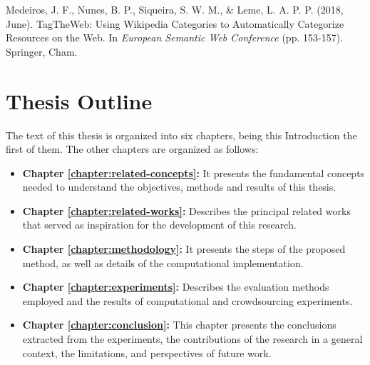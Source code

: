 Medeiros, J. F., Nunes, B. P., Siqueira, S. W. M., \& Leme, L. A. P. P. (2018, June). TagTheWeb: Using Wikipedia Categories to Automatically Categorize Resources on the Web. In \textit{European Semantic Web Conference} (pp. 153-157). Springer, Cham.

\section{\hspace*{3pt}Thesis Outline}

The text of this thesis is organized into six chapters, being this Introduction the first of them. The other chapters are organized as follows:

\begin{itemize}
\item\textbf {Chapter \ref{chapter:related-concepts}:} It presents the fundamental concepts needed to understand the objectives, methods and results of this thesis.

\item \textbf {Chapter \ref{chapter:related-works}:} Describes the principal related works that served as inspiration for the development of this research.

\item \textbf {Chapter \ref{chapter:methodology}:} It presents the steps of the proposed method, as well as details of the computational implementation.

\item \textbf {Chapter \ref{chapter:experiments}:} Describes the evaluation methods employed and the results of computational and crowdsourcing experiments.

\item \textbf {Chapter \ref{chapter:conclusion}:} This chapter presents the conclusions extracted from the experiments, the contributions of the research in a general context, the limitations, and perspectives of future work.

\end{itemize}
